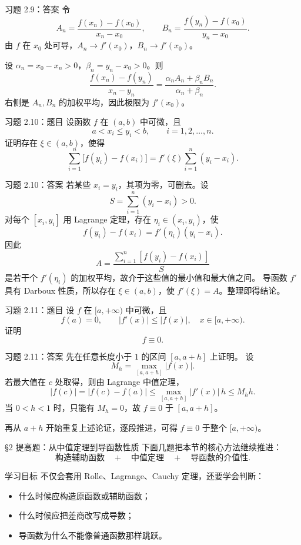 \documentclass[aspectratio=169,10pt]{ctexbeamer}
\begin{document}
\begin{frame}{习题 2.9：答案}
\small
令
\[
  A_n=\frac{f(x_n)-f(x_0)}{x_n-x_0},\qquad
  B_n=\frac{f(y_n)-f(x_0)}{y_n-x_0}.
\]
由 $f$ 在 $x_0$ 处可导，$A_n\to f'(x_0)$，$B_n\to f'(x_0)$。

设 $\alpha_n=x_0-x_n>0$，$\beta_n=y_n-x_0>0$。则
\[
  \frac{f(x_n)-f(y_n)}{x_n-y_n}
  =
  \frac{\alpha_n A_n+\beta_n B_n}{\alpha_n+\beta_n}.
\]
右侧是 $A_n,B_n$ 的加权平均，因此极限为 $f'(x_0)$。
\end{frame}

\begin{frame}{习题 2.10：题目}
\small
设函数 $f$ 在 $(a,b)$ 中可微，且
\[
  a<x_i\le y_i<b,\qquad i=1,2,\ldots,n.
\]
证明存在 $\xi\in(a,b)$，使得
\[
  \sum_{i=1}^n\bigl[f(y_i)-f(x_i)\bigr]
  =f'(\xi)\sum_{i=1}^n(y_i-x_i).
\]
\end{frame}

\begin{frame}{习题 2.10：答案}
\footnotesize
若某些 $x_i=y_i$，其项为零，可删去。设
\[
  S=\sum_{i=1}^n(y_i-x_i)>0.
\]
对每个 $[x_i,y_i]$ 用 Lagrange 定理，存在 $\eta_i\in(x_i,y_i)$，使
\[
  f(y_i)-f(x_i)=f'(\eta_i)(y_i-x_i).
\]
因此
\[
  A=\frac{\sum_{i=1}^n[f(y_i)-f(x_i)]}{S}
\]
是若干个 $f'(\eta_i)$ 的加权平均，故介于这些值的最小值和最大值之间。
导函数 $f'$ 具有 Darboux 性质，所以存在 $\xi\in(a,b)$，使
$f'(\xi)=A$。整理即得结论。
\end{frame}

\begin{frame}{习题 2.11：题目}
\small
设 $f$ 在 $[a,+\infty)$ 中可微，且
\[
  f(a)=0,\qquad |f'(x)|\le |f(x)|,\quad x\in[a,+\infty).
\]
证明
\[
  f\equiv0.
\]
\end{frame}

\begin{frame}{习题 2.11：答案}
\small
先在任意长度小于 $1$ 的区间 $[a,a+h]$ 上证明。
设
\[
  M_h=\max_{[a,a+h]}|f(x)|.
\]
若最大值在 $c$ 处取得，则由 Lagrange 中值定理，
\[
  |f(c)|=|f(c)-f(a)|\le \max_{[a,a+h]}|f'(x)|\,h
  \le M_h h.
\]
当 $0<h<1$ 时，只能有 $M_h=0$，故 $f\equiv0$ 于 $[a,a+h]$。

再从 $a+h$ 开始重复上述论证，逐段推进，可得
$f\equiv0$ 于整个 $[a,+\infty)$。
\end{frame}

\begin{frame}{§2 提高题：从中值定理到导函数性质}
\small
下面几题把本节的核心方法继续推进：
\[
  \text{构造辅助函数}
  \quad+\quad
  \text{中值定理}
  \quad+\quad
  \text{导函数的介值性}.
\]

\begin{block}{学习目标}
不仅会套用 Rolle、Lagrange、Cauchy 定理，还要学会判断：
\begin{itemize}
  \item 什么时候应构造原函数或辅助函数；
  \item 什么时候应把差商改写成导数；
  \item 导函数为什么不能像普通函数那样跳跃。
\end{itemize}
\end{block}
\end{frame}
\end{document}
